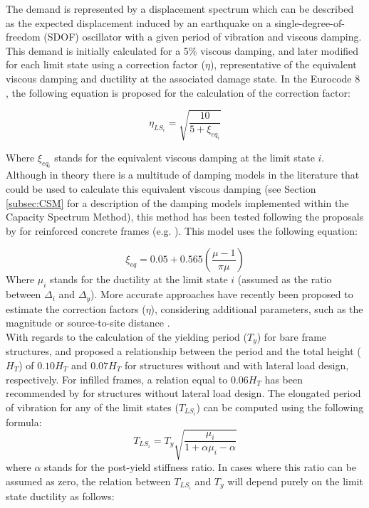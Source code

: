 The demand is represented by a displacement spectrum which can be described as the expected displacement induced by an earthquake on a single-degree-of-freedom (SDOF) oscillator with a given period of vibration and viscous damping. This demand is initially calculated for a 5\% viscous damping, and later modified for each limit state using a correction factor ($\eta$), representative of the equivalent viscous damping and ductility at the associated damage state. In the Eurocode 8 \citep{CEN2005}, the following equation is proposed for the calculation of the correction factor:

\begin{equation}
\eta_{LS_i} = \sqrt{\frac{10}{5+\xi_{eq_i}}}
\end{equation}

Where $\xi_{eq_i}$ stands for the equivalent viscous damping at the limit state $i$. Although in theory there is a multitude of damping models in the literature that could be used to calculate this equivalent viscous damping (see Section \ref{subsec:CSM} for a description of the damping models implemented within the Capacity Spectrum Method), this method has been tested following the proposals by \cite{PriestleyEtAl2007} for reinforced concrete frames (e.g. \cite{BalEtAl2010} \cite{SilvaEtAl2013}). This model uses the following equation: 

\begin{equation}
\xi_{eq} = 0.05 + 0.565\left(\frac{\mu-1}{\pi\mu}\right)
\end{equation}
Where $\mu_i$ stands for the ductility at the limit state $i$ (assumed as the ratio between $\Delta_i$ and $\Delta_y$). More accurate approaches have recently been proposed to estimate the correction factors ($\eta$), considering additional parameters, such as the magnitude or source-to-site distance \citep{RezaeianEtAl2012}.\\
With regards to the calculation of the yielding period ($T_y$) for bare frame structures, \cite{CrowleyPinho2004} and \cite{CrowleyEtAl2008} proposed a relationship between the period and the total height ($H_T$) of $0.10H_T$ and $0.07H_T$ for structures without and with lateral load design, respectively. For infilled frames, a relation equal to $0.06H_T$ has been recommended by \cite{CrowleyPinho2006} for structures without lateral load design. The elongated period of vibration for any of the limit states ($T_{LS_i}$) can be computed using the following formula:
\begin{equation}
T_{LS_i} = T_y\sqrt{\frac{\mu_{i}}{1+\alpha\mu_{i}-\alpha}}
\end{equation}
where $\alpha$ stands for the post-yield stiffness ratio. In cases where this ratio can be assumed as zero, the relation between $T_{LS_i}$ and $T_y$ will depend purely on the limit state ductility as follows:

